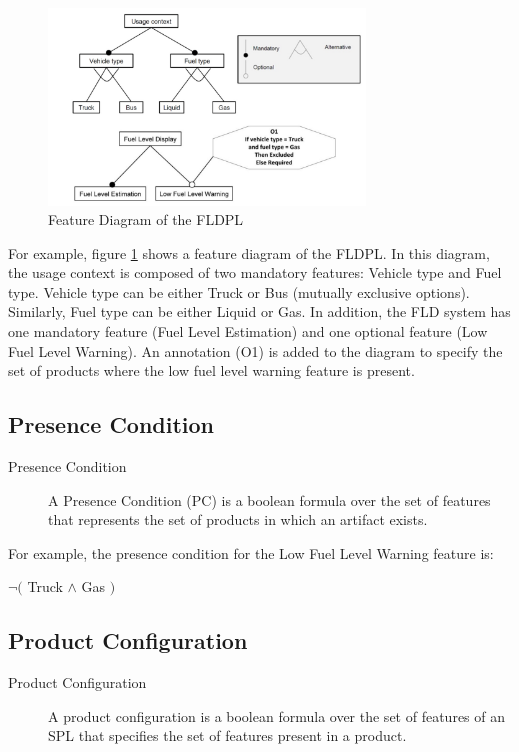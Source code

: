 \documentclass[11pt]{article}
\begin{document}
\begin{figure}
  \centering
    \includegraphics[width=0.75\textwidth]{FeatureDiagram}
  \caption{Feature Diagram of the FLDPL}
  \label{fig:FeatureDiagram}
\end{figure}

For example, figure \ref{fig:FeatureDiagram} shows a feature diagram of the FLDPL. In this diagram, the usage context is composed of two mandatory features: Vehicle type and Fuel type. Vehicle type can be either Truck or Bus (mutually exclusive options). Similarly, Fuel type can be either Liquid or Gas. In addition, the FLD system has one mandatory feature (Fuel Level Estimation) and one optional feature (Low Fuel Level Warning). An annotation (O1) is added to the diagram to specify the set of products where the low fuel level warning feature is present.

\subsection{Presence Condition}

\begin{description}

\item[Presence Condition]
A Presence Condition (PC) is a boolean formula over the set of features that represents the set of products in which an artifact exists.
\end{description}

For example, the presence condition for the Low Fuel Level Warning feature is: 

$\neg ($ Truck $\wedge$ Gas $)$

\subsection{Product Configuration}

\begin{description}

\item[Product Configuration]
A product configuration is a boolean formula over the set of features of an SPL that specifies the set of features present in a product.
\end{description}
\end{document}
